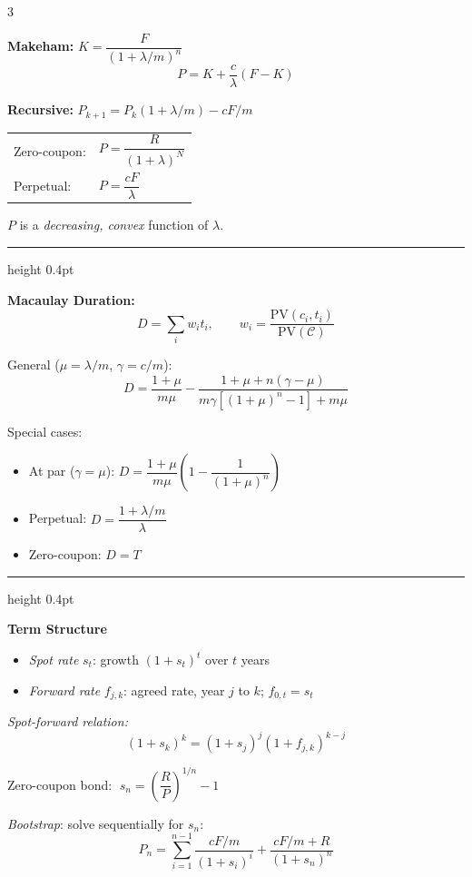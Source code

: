 \documentclass[9pt, a4paper, landscape]{extarticle}
\newcommand{\chbox}[2]{%
  \begin{tcolorbox}[sheet, title={\bfseries\small #1}]
  #2
  \end{tcolorbox}%
}
\newcommand{\boxrule}{\vspace{3pt}\textcolor{ruleclr}{\hrule height 0.4pt}\vspace{3pt}}
\begin{document}
\begin{multicols}{3}
{\textbf{Makeham:}\; $K=\dfrac{F}{(1+\lambda/m)^n}$
\[P=K+\frac{c}{\lambda}(F-K)\]

\textbf{Recursive:}\; $P_{k+1}=P_k(1+\lambda/m)-cF/m$

\begin{tabular}{@{}ll@{}}
  Zero-coupon: & $P=\dfrac{R}{(1+\lambda)^N}$ \\[5pt]
  Perpetual:   & $P=\dfrac{cF}{\lambda}$ \\
\end{tabular}

\smallskip
$P$ is a \emph{decreasing, convex} function of $\lambda$.

\boxrule

\textbf{Macaulay Duration:}
\[
D=\sum_i w_i t_i,\qquad w_i=\frac{\mathrm{PV}(c_i,t_i)}{\mathrm{PV}(\mathcal{C})}
\]

General ($\mu=\lambda/m$, $\gamma=c/m$):
\[
D=\frac{1+\mu}{m\mu}-\frac{1+\mu+n(\gamma-\mu)}{m\gamma[(1+\mu)^n-1]+m\mu}
\]

Special cases:
\begin{itemize}
  \item At par ($\gamma=\mu$):\; $D=\dfrac{1+\mu}{m\mu}\!\left(1-\dfrac{1}{(1+\mu)^n}\right)$
  \item Perpetual:\; $D=\dfrac{1+\lambda/m}{\lambda}$
  \item Zero-coupon:\; $D=T$
\end{itemize}

\boxrule

\textbf{Term Structure}

\begin{itemize}
  \item \textit{Spot rate} $s_t$: growth $(1+s_t)^t$ over $t$ years
  \item \textit{Forward rate} $f_{j,k}$: agreed rate, year $j$ to $k$;\; $f_{0,t}=s_t$
\end{itemize}

\textit{Spot-forward relation:}
\[(1+s_k)^k=(1+s_j)^j(1+f_{j,k})^{k-j}\]

Zero-coupon bond: $\;s_n=\!\left(\dfrac{R}{P}\right)^{1/n}\!-1$

\textit{Bootstrap}: solve sequentially for $s_n$:
\[
P_n=\sum_{i=1}^{n-1}\!\frac{cF/m}{(1+s_i)^i}+\frac{cF/m+R}{(1+s_n)^n}
\]
}

\chbox{Chapter 3 --- Asset Returns \& Portfolio Theory}{

}
\end{multicols}
\end{document}

